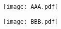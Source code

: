 \documentclass[preview]{standalone}
\begin{document}
\begin{minipage}{0.5\textwidth} {\centering \texttt{[image: AAA.pdf]}} \end{minipage} 
\begin{minipage}{0.5\textwidth} {\centering \texttt{[image: BBB.pdf]}} \end{minipage}
\end{document}
